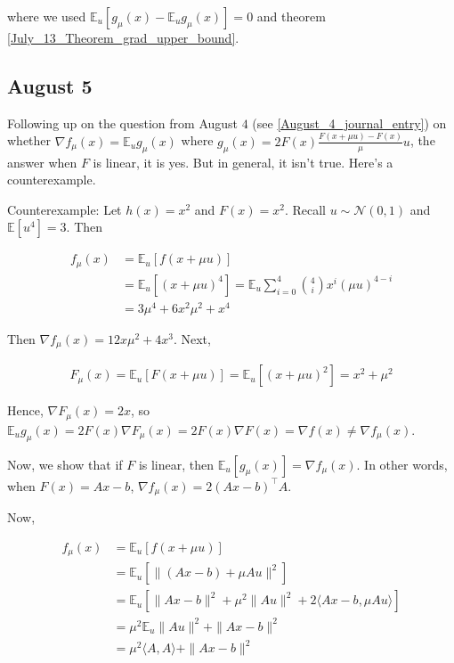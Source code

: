 \documentclass{article}
\begin{document}
where we used $\mathbb{E}_u[g_{\mu}(x) - \mathbb{E}_ug_{\mu}(x)] = 0$ and theorem \ref{July_13_Theorem_grad_upper_bound}. 


\subsection{August 5} \label{August_5_Journal_entry}

Following up on the question from August $4$ (see \ref{August_4_journal_entry}) on whether $\nabla f_{\mu}(x) = \mathbb{E}_ug_{\mu}(x)$ where $g_{\mu}(x) = 2F(x)\frac{F(x+\mu u)-F(x)}{\mu}u$, the answer when $F$ is linear, it is yes. But in general, it isn't true. Here's a counterexample. \newline 

Counterexample: Let $h(x) = x^2$ and $F(x) = x^2$. Recall $u \sim \mathcal{N}(0,1)$ and $\mathbb{E}[u^4] = 3$. Then \newline 

\begin{align*}
f_{\mu}(x) & = \mathbb{E}_u[f(x+\mu u)] \\ & = \mathbb{E}_u[(x+\mu u)^4] = \mathbb{E}_u\sum_{i=0}^4 {4 \choose i}x^i(\mu u)^{4-i} \\ & = 3\mu^4 + 6x^2\mu^2 + x^4
\end{align*}

Then $\nabla f_{\mu}(x) = 12x\mu^2 + 4x^3$. Next,

\begin{align*}
F_{\mu}(x) = \mathbb{E}_u[F(x+\mu u)] = \mathbb{E}_u[(x+\mu u)^2] = x^2 + \mu^2
\end{align*}

Hence, $\nabla F_{\mu}(x) = 2x$, so $\mathbb{E}_ug_{\mu}(x) = 2F(x)\nabla F_{\mu}(x) = 2F(x)\nabla F(x) = \nabla f(x) \neq \nabla f_{\mu}(x)$. \newline 

Now, we show that if $F$ is linear, then $\mathbb{E}_u[g_{\mu}(x)] = \nabla f_{\mu}(x)$. In other words, when $F(x) = Ax- b$, $\nabla f_{\mu}(x) = 2(Ax-b)^\top A$. \newline 

Now, 

\begin{align*}
f_{\mu}(x) & = \mathbb{E}_u[f(x+\mu u)] \\ & = \mathbb{E}_u[\|(Ax-b) + \mu Au\|^2] \\ & = \mathbb{E}_u\left[\| Ax-b\|^2 + \mu^2\|Au\|^2 + 2\langle Ax-b, \mu Au\rangle \right] \\ & = \mu^2\mathbb{E}_u\| Au\|^2 + \|Ax-b\|^2 \\ & = \mu^2 \langle A,A\rangle + \|Ax-b\|^2
\end{align*}
\end{document}
